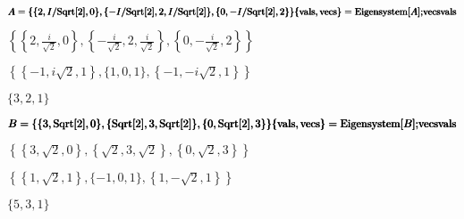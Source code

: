 \documentclass{article}
\begin{document}
\begin{doublespace}
\noindent\(\pmb{A=\{\{2,I/\text{Sqrt}[2],0\},\{-I/\text{Sqrt}[2],2,I/\text{Sqrt}[2]\},\{0,-I/\text{Sqrt}[2],2\}\}}\\
\pmb{\{\text{vals},\text{vecs}\}=\text{Eigensystem}[A];}\\
\pmb{\text{vecs}}\\
\pmb{\text{vals}}\)
\end{doublespace}

\begin{doublespace}
\noindent\(\left\{\left\{2,\frac{i}{\sqrt{2}},0\right\},\left\{-\frac{i}{\sqrt{2}},2,\frac{i}{\sqrt{2}}\right\},\left\{0,-\frac{i}{\sqrt{2}},2\right\}\right\}\)
\end{doublespace}

\begin{doublespace}
\noindent\(\left\{\left\{-1,i \sqrt{2},1\right\},\{1,0,1\},\left\{-1,-i \sqrt{2},1\right\}\right\}\)
\end{doublespace}

\begin{doublespace}
\noindent\(\{3,2,1\}\)
\end{doublespace}

\begin{doublespace}
\noindent\(\pmb{B=\{\{3,\text{Sqrt}[2],0\},\{\text{Sqrt}[2],3,\text{Sqrt}[2]\},\{0,\text{Sqrt}[2],3\}\}}\\
\pmb{\{\text{vals},\text{vecs}\}=\text{Eigensystem}[B];}\\
\pmb{\text{vecs}}\\
\pmb{\text{vals}}\)
\end{doublespace}

\begin{doublespace}
\noindent\(\left\{\left\{3,\sqrt{2},0\right\},\left\{\sqrt{2},3,\sqrt{2}\right\},\left\{0,\sqrt{2},3\right\}\right\}\)
\end{doublespace}

\begin{doublespace}
\noindent\(\left\{\left\{1,\sqrt{2},1\right\},\{-1,0,1\},\left\{1,-\sqrt{2},1\right\}\right\}\)
\end{doublespace}

\begin{doublespace}
\noindent\(\{5,3,1\}\)
\end{doublespace}
\end{document}
